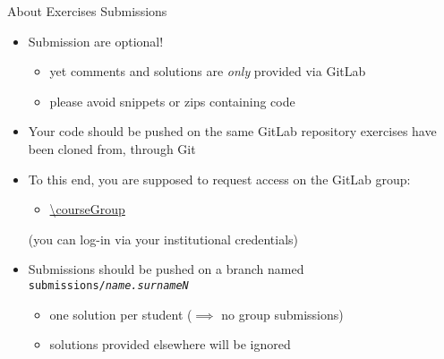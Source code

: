 \documentclass[presentation]{beamer}\mode<presentation>{\usetheme{AMSBolognaFC}}
\begin{document}
\begin{frame}[c,allowframebreaks]{About Exercises Submissions}
\label{slide:submissions}

    \begin{itemize}
		\item Submission are optional!
        \begin{itemize}
            \item yet comments and solutions are \emph{only} provided via GitLab
            \item please avoid snippets or zips containing code
        \end{itemize}

		\medskip

        \item Your code should be pushed on the same GitLab repository exercises have been cloned from, \alert{through Git}

        \medskip

        \item To this end, you are supposed to request access on the \courseAcronym{} \academicYearShort{} GitLab group:
        \begin{itemize}
            \item \url{\courseGroup}
        \end{itemize}
		(you can log-in via your institutional credentials)

        \medskip

        \item Submissions should be pushed on a branch named \alert{\texttt{submissions/\textit{name.surnameN}}} %
        \begin{itemize}
            \item one solution per student ($\implies$ no group submissions)
            \item solutions provided elsewhere will be ignored
        \end{itemize}
    \end{itemize}
\end{frame}
\end{document}

